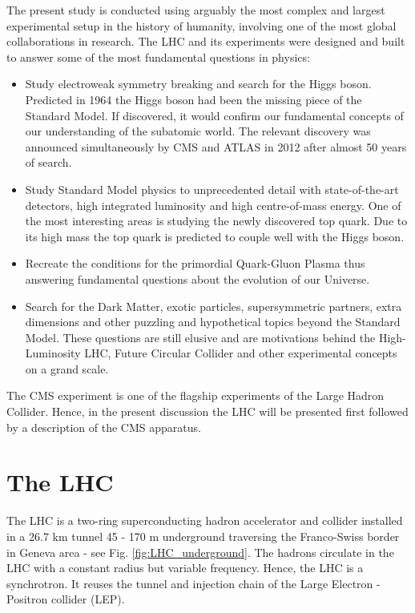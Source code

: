 \label{sec:experimental_setup}

The present study is conducted using arguably the most complex and largest experimental setup in the history of humanity, involving one of the most global collaborations in research. The LHC and its experiments were designed and built to answer some of the most fundamental questions in physics:

\begin{itemize}
\item Study electroweak symmetry breaking and search for the Higgs boson. Predicted in 1964 \cite{Higgs:1964ia} \cite{Englert:1964et} the Higgs boson had been the missing piece of the Standard Model. If discovered, it would confirm our fundamental concepts of our understanding of the subatomic world. The relevant discovery was announced simultaneously by CMS and ATLAS in 2012 \cite{Chatrchyan:2012xdj} \cite{Aad:2012tfa} after almost 50 years of search.
\item Study Standard Model physics to unprecedented detail with state-of-the-art detectors, high integrated luminosity and high centre-of-mass energy. One of the most interesting areas is studying the newly discovered top quark. Due to its high mass the top quark is predicted to couple well with the Higgs boson.
\item Recreate the conditions for the primordial Quark-Gluon Plasma thus answering fundamental questions about the evolution of our Universe.
\item Search for the Dark Matter, exotic particles, supersymmetric partners, extra dimensions and other puzzling and hypothetical topics beyond the Standard Model. These questions are still elusive and are motivations behind the High-Luminosity LHC, Future Circular Collider and other experimental concepts on a grand scale.
\end {itemize}

The CMS experiment is one of the flagship experiments of the Large Hadron Collider. Hence, in the present discussion the LHC will be presented first followed by a description of the CMS apparatus.

\section{The LHC}

The LHC is a two-ring superconducting hadron accelerator and collider installed in a 26.7 km tunnel 45 - 170 m underground traversing the Franco-Swiss border in Geneva area - see Fig. \ref{fig:LHC_underground}. The hadrons circulate in the LHC with a constant radius but variable frequency. Hence, the LHC is a synchrotron. It reuses the tunnel and injection chain of the Large Electron - Positron collider (LEP).

